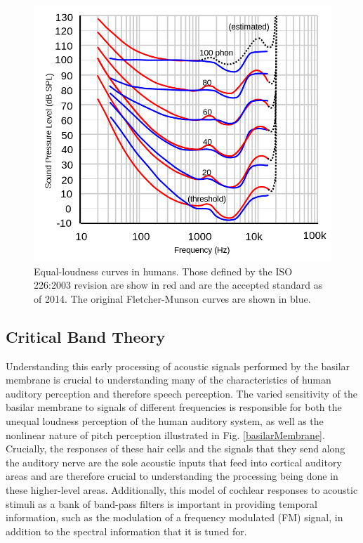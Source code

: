\documentclass[titlepage]{article}
\begin{document}
    \begin{figure}
      \centering
      \includegraphics[scale=0.3]{fletcherMunsonCurveWithUnits}
      \caption{Equal-loudness curves in humans. Those defined by the ISO 226:2003 revision
      are show in red and are the accepted standard as of 2014.
      The original Fletcher-Munson curves are shown in blue.}
      \label{fletcherMunsonCurve}
    \end{figure}

  \subsection{Critical Band Theory}

    Understanding this early processing of acoustic signals performed by the
    basilar membrane is crucial to understanding many of the characteristics
    of human auditory perception and therefore speech perception. The varied
    sensitivity of the basilar membrane to signals of different frequencies
    is responsible for both the unequal loudness perception of the human
    auditory system, as well as the nonlinear nature of pitch perception
    illustrated in Fig. \ref{basilarMembrane}. Crucially,
    the responses of these hair cells and the signals that they send along the auditory nerve are the sole
    acoustic inputs that feed into cortical auditory areas and are therefore crucial to understanding
    the processing being done in these higher-level areas. Additionally, this model of cochlear responses to
    acoustic stimuli as a bank of band-pass filters is important in providing temporal information, such
    as the modulation of a frequency modulated (FM) signal, in addition to the spectral information that it
    is tuned for.
\end{document}
